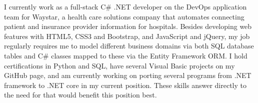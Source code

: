 I currently work as a full-stack C\# .NET developer on the DevOps application team for Waystar, 
a health care solutions company that automates connecting patient and insurance provider information for hospitals. 
Besides developing web features with HTML5, CSS3 and Bootstrap, and JavaScript and jQuery, 
my job regularly requires me to model different business domains 
via both SQL database tables and C\# classes mapped to these via the Entity Framework ORM. 
I hold certifications in Python and SQL, have several Visual Basic projects on my GitHub page, and am currently working on porting several programs from .NET framework to .NET core in my current position. These skills answer directly to the need for \jobrequirement{} that would benefit this position best. 